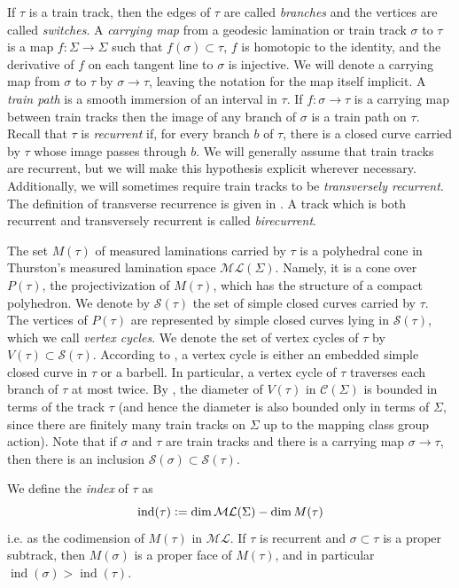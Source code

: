 \documentclass[11pt]{article}
\theoremstyle{remark}
\def\S{{\mathcal S}}
\def\ML{{\mathcal{ML}}}
\def\C{{\mathcal C}}
\def\ind{\operatorname{ind}}
\begin{document}
If $\tau$ is a train track, then the edges of $\tau$ are called \emph{branches}
and the vertices are called \emph{switches}. A \emph{carrying map} from a
geodesic lamination or train track $\sigma$ to $\tau$ is a map
$f:\Sigma\to\Sigma$ such that $f(\sigma)\subset \tau$, $f$ is homotopic to the
identity, and the derivative of $f$ on each tangent line to $\sigma$ is injective.
We will denote a carrying map from $\sigma$ to $\tau$ by $\sigma\to \tau$,
leaving the notation for the map itself implicit. A \emph{train path} is a smooth
immersion of an interval in $\tau$. If $f:\sigma \to \tau$ is a carrying map
between train tracks then the image of any branch of $\sigma$ is a train path
on $\tau$. Recall that $\tau$ is \emph{recurrent} if, for every branch $b$ of
$\tau$, there is a closed curve carried by $\tau$ whose image passes through
$b$.
We will generally assume that train tracks are recurrent,
but we will make this hypothesis explicit
wherever necessary.
Additionally, we will sometimes require train tracks to be \emph{transversely recurrent}.
The definition of transverse recurrence is given in \cite{Penner}. A track
which is both recurrent and transversely recurrent is called \emph{birecurrent}.

The set $M(\tau)$ of measured laminations carried by $\tau$ is a polyhedral cone
in Thurston's measured lamination space $\ML(\Sigma)$.
Namely, it is a cone over $P(\tau)$, the projectivization of $M(\tau)$, which has the structure of a compact polyhedron.
We denote by $\S(\tau)$ the set of simple closed curves carried by $\tau$.
The vertices of $P(\tau)$ are represented by simple closed curves lying in
$\S(\tau)$, which we call \emph{vertex cycles}. We denote the set of vertex
cycles of $\tau$ by $V(\tau) \subset \S(\tau)$.
According to
\cite[Proposition 3.11.3]{Mosher}, a vertex cycle is either an embedded simple
closed curve in $\tau$ or a barbell. In particular, a vertex cycle of
$\tau$ traverses each branch of $\tau$ at most twice.
By \cite[Corollary 2.3]{HamenstadtTT}, the diameter of $V(\tau)$
in $\C(\Sigma)$ is bounded in terms of the track $\tau$ (and hence the diameter is
also bounded only in terms of $\Sigma$, since there are finitely many train tracks
on $\Sigma$ up to the mapping class group action).
Note that if
$\sigma$ and $\tau$ are train tracks and there is a carrying map $\sigma\to \tau$,
then there is an inclusion $\S(\sigma) \subset \S(\tau)$.


We define the \emph{index} of $\tau$ as
$$\ind(\tau)\vcentcolon=\dim \ML(\Sigma)-\dim M(\tau)$$ i.e. as the codimension of
$M(\tau)$ in $\ML$. If $\tau$ is
recurrent and $\sigma\subset\tau$ is a proper subtrack, then
$M(\sigma)$ is a proper face of $M(\tau)$,
and in particular $\ind(\sigma)>\ind(\tau)$.
\end{document}
